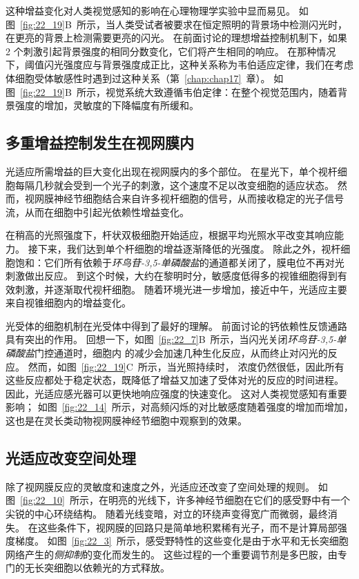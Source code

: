 这种增益变化对人类视觉感知的影响在心理物理学实验中显而易见。
如图~\ref{fig:22_19}B~所示，当人类受试者被要求在恒定照明的背景场中检测闪光时，在更亮的背景上检测需要更亮的闪光。
在前面讨论的理想增益控制机制下，如果 2 个刺激引起背景强度的相同分数变化，它们将产生相同的响应。
在那种情况下，阈值闪光强度应与背景强度成正比，这种关系称为韦伯适应定律，我们在考虑体细胞受体敏感性时遇到过这种关系（第~\ref{chap:chap17}~章）。
如图~\ref{fig:22_19}B~所示，视觉系统大致遵循韦伯定律：在整个视觉范围内，随着背景强度的增加，灵敏度的下降幅度有所缓和。



\subsection{多重增益控制发生在视网膜内}

光适应所需增益的巨大变化出现在视网膜内的多个部位。 
在星光下，单个视杆细胞每隔几秒就会受到一个光子的刺激，这个速度不足以改变细胞的适应状态。
然而，视网膜神经节细胞结合来自许多视杆细胞的信号，从而接收稳定的光子信号流，从而在细胞中引起光依赖性增益变化。


在稍高的光照强度下，杆状双极细胞开始适应，根据平均光照水平改变其响应能力。
接下来，我们达到单个杆细胞的增益逐渐降低的光强度。 
除此之外，视杆细胞饱和：它们所有依赖于\textit{环鸟苷-3,5-单磷酸盐}的通道都关闭了，膜电位不再对光刺激做出反应。
到这个时候，大约在黎明时分，敏感度低得多的视锥细胞得到有效刺激，并逐渐取代视杆细胞。
随着环境光进一步增加，接近中午，光适应主要来自视锥细胞内的增益变化。


光受体的细胞机制在光受体中得到了最好的理解。
前面讨论的钙依赖性反馈通路具有突出的作用。
回想一下，如图~\ref{fig:22_7}B~所示，当闪光关闭\textit{环鸟苷-3,5-单磷酸盐}门控通道时，细胞内  的减少会加速几种生化反应，从而终止对闪光的反应。
然而，如图~\ref{fig:22_19}C~所示，当光照持续时， 浓度仍然很低，因此所有这些反应都处于稳定状态，既降低了增益又加速了受体对光的反应的时间进程。
因此，光适应感光器可以更快地响应强度的快速变化。
这对人类视觉感知有重要影响；
如图~\ref{fig:22_14}~所示，对高频闪烁的对比敏感度随着强度的增加而增加，这也是在灵长类动物视网膜神经节细胞中观察到的效果。



\subsection{光适应改变空间处理}

除了视网膜反应的灵敏度和速度之外，光适应还改变了空间处理的规则。
如图~\ref{fig:22_10}~所示，在明亮的光线下，许多神经节细胞在它们的感受野中有一个尖锐的中心环绕结构。 
随着光线变暗，对立的环绕声变得宽广而微弱，最终消失。
在这些条件下，视网膜的回路只是简单地积累稀有光子，而不是计算局部强度梯度。
如图~\ref{fig:22_3}~所示，感受野特性的这些变化是由于水平和无长突细胞网络产生的\textit{侧抑制}的变化而发生的。
这些过程的一个重要调节剂是多巴胺，由专门的无长突细胞以依赖光的方式释放。


